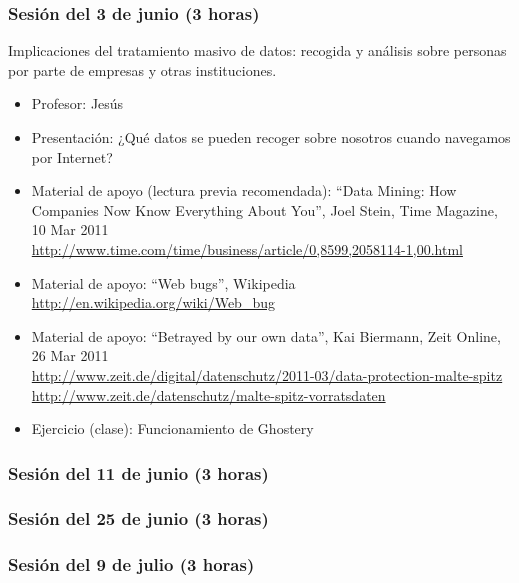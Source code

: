 \documentclass[a4paper,12pt]{article}
\begin{document}
\subsubsection{Sesión del 3 de junio (3 horas)}

Implicaciones del tratamiento masivo de datos: recogida y análisis sobre personas por parte de empresas y otras instituciones.

\begin{itemize}
\item Profesor: Jesús
\item Presentación: ¿Qué datos se pueden recoger sobre nosotros cuando navegamos por Internet?
\item Material de apoyo (lectura previa recomendada): ``Data Mining: How Companies Now Know Everything About You'', Joel Stein, Time Magazine, 10 Mar 2011 \\
  \url{http://www.time.com/time/business/article/0,8599,2058114-1,00.html}
\item Material de apoyo: ``Web bugs'', Wikipedia \\
  \url{http://en.wikipedia.org/wiki/Web_bug}
\item Material de apoyo: ``Betrayed by our own data'', Kai Biermann, Zeit Online, 26 Mar 2011 \\
  \url{http://www.zeit.de/digital/datenschutz/2011-03/data-protection-malte-spitz} \\
  \url{http://www.zeit.de/datenschutz/malte-spitz-vorratsdaten}
\item Ejercicio (clase): Funcionamiento de Ghostery
\end{itemize}

\subsubsection{Sesión del 11 de junio (3 horas)}


\subsubsection{Sesión del 25 de junio (3 horas)}


\subsubsection{Sesión del 9 de julio (3 horas)}
\end{document}
